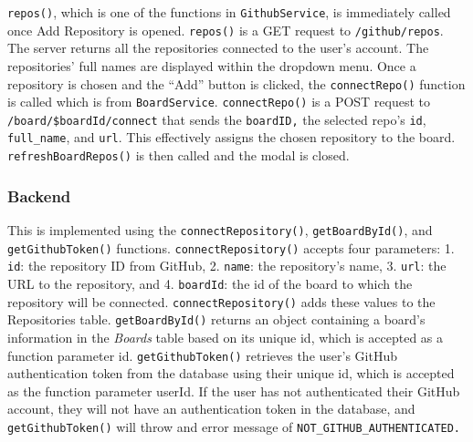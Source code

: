 \documentclass{article}
\def\code#1{\texttt{#1}}
\begin{document}
\code{repos()}, which is one of the functions in \code{GithubService}, is
immediately called once Add Repository is opened. \code{repos()} is a GET
request to \code{/github/repos}. The server returns all the repositories
connected to the user’s account. The repositories’ full names are displayed
within the dropdown menu. Once a repository is chosen and the “Add” button is
clicked, the \code{connectRepo()} function is called which is from
\code{BoardService}. \code{connectRepo()} is a POST request to
\code{/board/\${boardId}/connect} that sends the \code{boardID,} the selected
repo’s \code{id}, \code{full\_name}, and \code{url}. This effectively assigns
the chosen repository to the board. \code{refreshBoardRepos()} is then called
and the modal is closed.

\subsubsection{Backend}
This is implemented using the \code{connectRepository()}, \code{getBoardById()},
and \code{getGithubToken()} functions. \code{connectRepository()} accepts four
parameters: 1. \code{id}: the repository ID from GitHub, 2. \code{name}: the
repository’s name, 3. \code{url}: the URL to the repository, and 4.
\code{boardId}: the id of the board to which the repository will be connected.
\code{connectRepository()} adds these values to the Repositories table.
\code{getBoardById()} returns an object containing a board’s information in the
\emph{Boards} table based on its unique id, which is accepted as a function
parameter id. \code{getGithubToken()} retrieves the user’s GitHub authentication
token from the database using their unique id, which is accepted as the function
parameter userId. If the user has not authenticated their GitHub account, they
will not have an authentication token in the database, and
\code{getGithubToken()} will throw and error message of
\code{NOT\_GITHUB\_AUTHENTICATED.}
\end{document}
